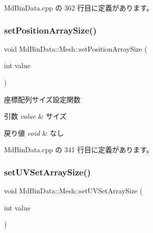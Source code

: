  Md\+Bin\+Data.\+cpp の 362 行目に定義があります。

\mbox{\label{class_md_bin_data_1_1_mesh_a684634dc8922d6286fc82ae12d41f3b4}} 
\subsubsection{\texorpdfstring{set\+Position\+Array\+Size()}{setPositionArraySize()}}
{\footnotesize\ttfamily void Md\+Bin\+Data\+::\+Mesh\+::set\+Position\+Array\+Size (\begin{DoxyParamCaption}\item[{int}]{value }\end{DoxyParamCaption})}



座標配列サイズ設定関数 


\begin{DoxyParams}{引数}
{\em value} & サイズ \\
\hline
\end{DoxyParams}

\begin{DoxyRetVals}{戻り値}
{\em void} & なし \\
\hline
\end{DoxyRetVals}


 Md\+Bin\+Data.\+cpp の 341 行目に定義があります。

\mbox{\label{class_md_bin_data_1_1_mesh_a0d0af992c9ca6a314b1d3baf35d96e81}} 
\subsubsection{\texorpdfstring{set\+U\+V\+Set\+Array\+Size()}{setUVSetArraySize()}}
{\footnotesize\ttfamily void Md\+Bin\+Data\+::\+Mesh\+::set\+U\+V\+Set\+Array\+Size (\begin{DoxyParamCaption}\item[{int}]{value }\end{DoxyParamCaption})}



